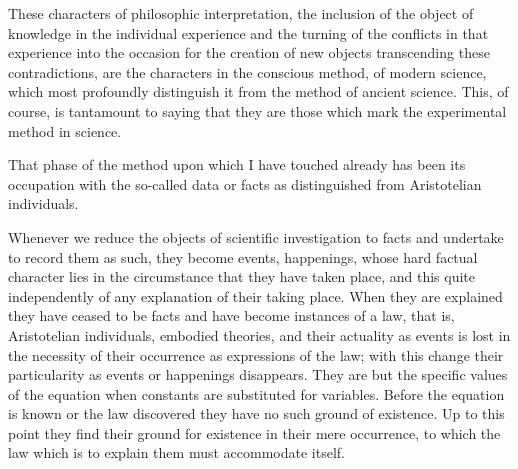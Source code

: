 \documentclass[12pt]{article}
\begin{document}
These characters of philosophic interpretation, the
inclusion of the object of knowledge in the individual
experience and the turning of the conflicts in that experience
into the occasion for the creation of new
objects transcending these contradictions, are the
characters in the conscious method, of modern science,
which most profoundly distinguish it from the method
of ancient science. This, of course, is tantamount to
saying that they are those which mark the experimental
method in science.


That phase of the method upon which I have touched
already has been its occupation with the so-called data
or facts as distinguished from Aristotelian individuals.


Whenever we reduce the objects of scientific investigation
to facts and undertake to record them as such,
they become events, happenings, whose hard factual
character lies in the circumstance that they have taken
place, and this quite independently of any explanation
of their taking place. When they are explained they
have ceased to be facts and have become instances of
a law, that is, Aristotelian individuals, embodied
theories, and their actuality as events is lost in the
necessity of their occurrence as expressions of the law;
with this change their particularity as events or happenings
disappears. They are but the specific values
of the equation when constants are substituted for
variables. Before the equation is known or the law
discovered they have no such ground of existence. Up
to this point they find their ground for existence in
their mere occurrence, to which the law which is to
explain them must accommodate itself.
\end{document}
